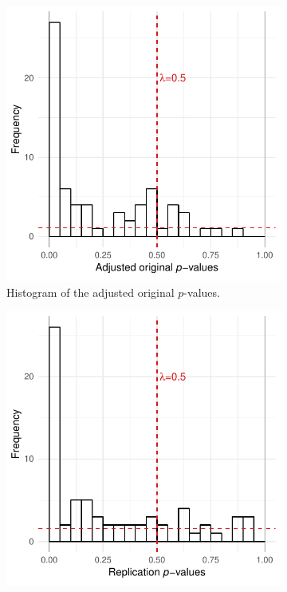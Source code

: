 \documentclass[aoas, preprint]{imsart}
\theoremstyle{definition}
\theoremstyle{custom}
\begin{document}
  \begin{figure}[htbp]
    \centering
    \begin{subfigure}[t]{0.49\hsize}
      \centering
      \includegraphics[width=\hsize]{fdp-original}
      \caption{Histogram of the adjusted original $p$-values.}
    \label{fig:fdp-original}
    \end{subfigure}
    \hfill
    \begin{subfigure}[t]{0.49\hsize}
      \centering
      \includegraphics[width=\hsize]{fdp-replication}

\end{subfigure}
\end{figure}
\end{document}
